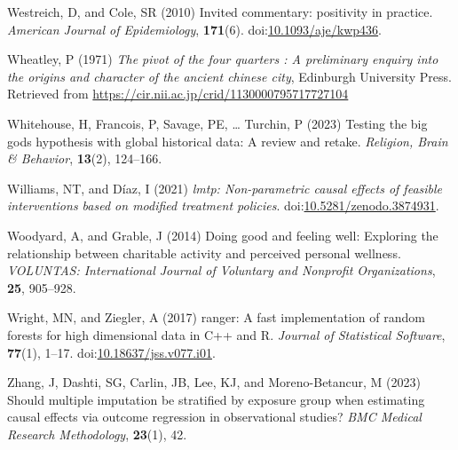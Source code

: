 \documentclass[
  single column]{article}
\newlength{\cslhangindent}
\newenvironment{CSLReferences}[2] %
 {\begin{list}{}{%
  \setlength{\itemindent}{0pt}
  \setlength{\leftmargin}{0pt}
  \setlength{\parsep}{0pt}
  \ifodd #1
   \setlength{\leftmargin}{\cslhangindent}
   \setlength{\itemindent}{-1\cslhangindent}
  \fi
  \setlength{\itemsep}{#2\baselineskip}}}
 {\end{list}}
\begin{document}
\begin{CSLReferences}{1}{0}
Westreich, D, and Cole, SR (2010) Invited commentary: positivity in
practice. \emph{American Journal of Epidemiology}, \textbf{171}(6).
doi:\href{https://doi.org/10.1093/aje/kwp436}{10.1093/aje/kwp436}.

Wheatley, P (1971) \emph{The pivot of the four quarters : A preliminary
enquiry into the origins and character of the ancient chinese city},
Edinburgh University Press. Retrieved from
\url{https://cir.nii.ac.jp/crid/1130000795717727104}

Whitehouse, H, Francois, P, Savage, PE, \ldots{} Turchin, P (2023)
Testing the big gods hypothesis with global historical data: A review
and retake. \emph{Religion, Brain \& Behavior}, \textbf{13}(2),
124--166.

Williams, NT, and Díaz, I (2021) \emph{{l}mtp: Non-parametric causal
effects of feasible interventions based on modified treatment policies}.
doi:\href{https://doi.org/10.5281/zenodo.3874931}{10.5281/zenodo.3874931}.

Woodyard, A, and Grable, J (2014) Doing good and feeling well: Exploring
the relationship between charitable activity and perceived personal
wellness. \emph{VOLUNTAS: International Journal of Voluntary and
Nonprofit Organizations}, \textbf{25}, 905--928.

Wright, MN, and Ziegler, A (2017) {ranger}: A fast implementation of
random forests for high dimensional data in {C++} and {R}. \emph{Journal
of Statistical Software}, \textbf{77}(1), 1--17.
doi:\href{https://doi.org/10.18637/jss.v077.i01}{10.18637/jss.v077.i01}.

Zhang, J, Dashti, SG, Carlin, JB, Lee, KJ, and Moreno-Betancur, M (2023)
Should multiple imputation be stratified by exposure group when
estimating causal effects via outcome regression in observational
studies? \emph{BMC Medical Research Methodology}, \textbf{23}(1), 42.

\end{CSLReferences}
\end{document}
